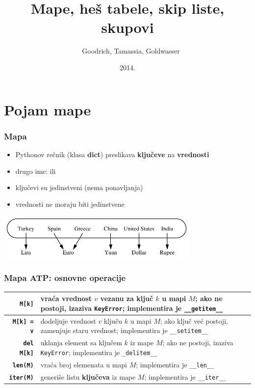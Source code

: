 \documentclass[compress]{beamer}
\title{Mape, heš tabele, skip liste, skupovi}
\author{\textcopyright \ \ Goodrich, Tamassia, Goldwasser}
\institute{Katedra za informatiku, Fakultet tehničkih nauka, Univerzitet u
Novom Sadu}
\date{2014.}
\begin{document}
\frame{\titlepage}

\section[Mapa]{Pojam mape}
\begin{frame}[fragile]
  \frametitle{Mapa}
  \begin{itemize}
    \item Pythonov rečnik (klasa \textbf{dict}) preslikava \textbf{ključeve} na \textbf{vrednosti} 
    \item drugo ime:  ili 
    \item ključevi su jedinstveni (nema ponavljanja)
    \item vrednosti ne moraju biti jedinstvene
  \end{itemize}
  \begin{center}
    \includegraphics[width=10cm]{asp-10-pic01.pdf}
  \end{center}
\end{frame}

\begin{frame}[fragile]
  \frametitle{Mapa ATP: osnovne operacije}
  \begin{center}
    \begin{tabular}{rp{8cm}}
      \textbf{\texttt{M[k]}} & vraća vrednost $v$ vezanu za ključ $k$ u mapi $M$; ako ne postoji, izaziva \texttt{KeyError}; implementira je \texttt{\_\_getitem\_\_} \\ \hline
      \textbf{\texttt{M[k] = v}} & dodeljuje vrednost $v$ ključu $k$ u mapi $M$; ako ključ već postoji, zamenjuje staru vrednost; implementira je \texttt{\_\_setitem\_\_} \\ \hline
      \textbf{\texttt{del M[k]}} & uklanja element sa ključem $k$ iz mape $M$; ako ne postoji, izaziva \texttt{KeyError}; implementira je \texttt{\_delitem\_\_} \\ \hline
      \textbf{\texttt{len(M)}} & vraća broj elemenata u mapi $M$; implementira je \texttt{\_\_len\_\_} \\ \hline
      \textbf{\texttt{iter(M)}} & generiše listu \textbf{ključeva} iz mape $M$;  implementira je \texttt{\_\_iter\_\_} \\
    \end{tabular}
  \end{center}
\end{frame}
\end{document}
